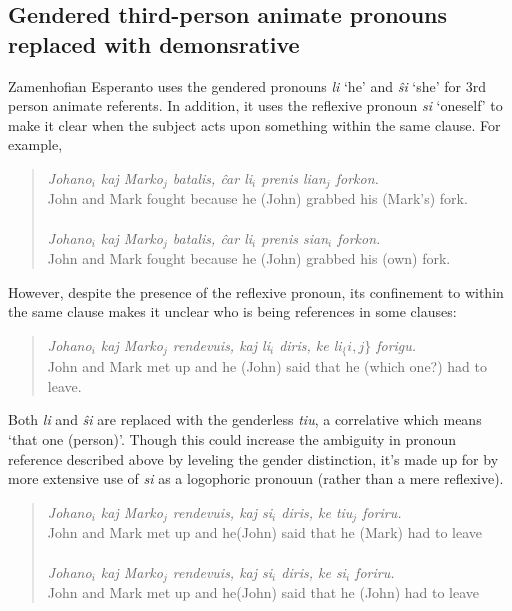 
\subsection{Gendered third-person animate pronouns replaced with demonsrative}

Zamenhofian Esperanto uses the gendered pronouns \textit{li} `he' and \textit{ŝi} `she' for 3rd person animate referents. In addition, it uses the reflexive pronoun \textit{si} `oneself' to make it clear when the subject acts upon something within the same clause. For example,
\begin{quote}
    \textit{Johano$_i$ kaj Marko$_j$ batalis, ĉar li$_i$ prenis lian$_j$ forkon.}\\
    John and Mark fought because he (John) grabbed his (Mark's) fork.\\
    \\
    \textit{Johano$_i$ kaj Marko$_j$ batalis, ĉar li$_i$ prenis sian$_i$ forkon.}\\
    John and Mark fought because he (John) grabbed his (own) fork.
\end{quote}
However, despite the presence of the reflexive pronoun, its confinement to within the same clause makes it unclear who is being references in some clauses:
\begin{quote}
    \textit{Johano$_i$ kaj Marko$_j$ rendevuis, kaj li$_i$ diris, ke li$_\{i,j\}$ forigu.}\\
    John and Mark met up and he (John) said that he (which one?) had to leave.
\end{quote}

Both \textit{li} and \textit{ŝi} are replaced with the genderless \textit{tiu}, a correlative which means `that one (person)'. Though this could increase the ambiguity in pronoun reference described above by leveling the gender distinction, it's made up for by more extensive use of \textit{si} as a logophoric pronouun (rather than a mere reflexive).
\begin{quote}
    \textit{Johano$_i$ kaj Marko$_j$ rendevuis, kaj si$_i$ diris, ke tiu$_j$ foriru.}\\
    John and Mark met up and he(John) said that he (Mark) had to leave\\
    \\
    \textit{Johano$_i$ kaj Marko$_j$ rendevuis, kaj si$_i$ diris, ke si$_i$ foriru.}\\
    John and Mark met up and he(John) said that he (John) had to leave
\end{quote}

